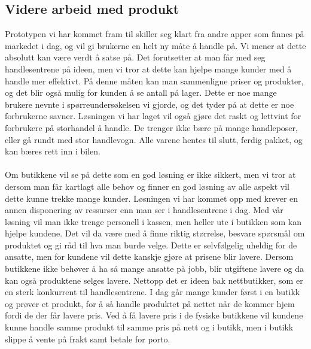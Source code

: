 \subsection{Videre arbeid med produkt}
Prototypen vi har kommet fram til skiller seg klart fra andre apper som finnes på markedet i dag, og vil gi brukerne en helt ny måte å handle på. Vi mener at dette absolutt kan være verdt å satse på. Det forutsetter at man får med seg handlesentrene på ideen, men vi tror at dette kan hjelpe mange kunder med å handle mer effektivt. På denne måten kan man sammenligne priser og produkter, og det blir også mulig for kunden å se antall på lager. Dette er noe mange brukere nevnte i spørreundersøkelsen vi gjorde, og det tyder på at dette er noe forbrukerne savner. Løsningen vi har laget vil også gjøre det raskt og lettvint for forbrukere på storhandel å handle. De trenger ikke bære på mange handleposer, eller gå rundt med stor handlevogn. Alle varene hentes til slutt, ferdig pakket, og kan bæres rett inn i bilen.
\\\\
Om butikkene vil se på dette som en god løsning er ikke sikkert, men vi tror at dersom man får kartlagt alle behov og finner en god løsning av alle aspekt vil dette kunne trekke mange kunder. Løsningen vi har kommet opp med krever en annen disponering av ressurser enn man ser i handlesentrene i dag. Med vår løsning vil man ikke trenge personell i kassen, men heller ute i butikken som kan hjelpe kundene. Det vil da være med å finne riktig størrelse, besvare spørsmål om produktet og gi råd til hva man burde velge. Dette er selvfølgelig uheldig for de ansatte, men for kundene vil dette kanskje gjøre at prisene blir lavere. Dersom butikkene ikke behøver å ha så mange ansatte på jobb, blir utgiftene lavere og da kan også produktene selges lavere. Nettopp det er ideen bak nettbutikker, som er en sterk konkurrent til handlesentrene. I dag går mange kunder først i en butikk og prøver et produkt, for å så handle produktet på nettet når de kommer hjem fordi de der får lavere pris. Ved å få lavere pris i de fysiske butikkene vil kundene kunne handle samme produkt til samme pris på nett og i butikk, men i butikk slippe å vente på frakt samt betale for porto.



